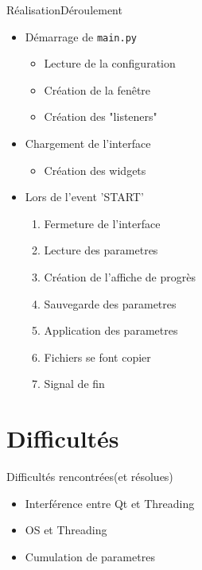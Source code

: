 \documentclass{beamer}
\begin{document}
	\begin{frame}{Réalisation}{Déroulement}
	  \begin{itemize}
			\item Démarrage de \texttt{main.py}
			\begin{itemize}
				\item Lecture de la configuration
				\item Création de la fenêtre
				\item Création des "listeners"
			\end{itemize}
			\item Chargement de l'interface
			\begin{itemize}
				\item Création des widgets
			\end{itemize}
			\item Lors de l'event 'START'
			\begin{enumerate}
				\item Fermeture de l'interface
				\item Lecture des parametres
				\item Création de l'affiche de progrès
				\item Sauvegarde des parametres
				\item Application des parametres
				\item Fichiers se font copier
				\item Signal de fin
			\end{enumerate}
	  \end{itemize}
	\end{frame}

	\section{Difficultés}
	\begin{frame}{Difficultés rencontrées}{(et résolues)}
	  \begin{itemize}
			\item Interférence entre Qt et Threading
			\item OS et Threading
			\item Cumulation de parametres
	  \end{itemize}
	\end{frame}
\end{document}
